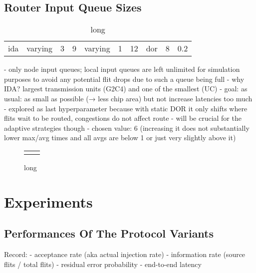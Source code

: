 \subsection{Router Input Queue Sizes}
\begin{table}
    \centering
    \begin{tabulary}{\textwidth}{C|C|C|C|C|C|C|C|C|C}
        \pProtVar{} & \pNCMode{} & \pEncMods{} & \pAuthMods{} & \pRQSize{} & \pARQLimit{} & \pARQTimeout{} & \pRStrat{} & \pNumAttackers{} & \pAttackProb{} \\\hline
        \gls{ida} & varying & 3 & 9 & varying & 1 & 12 & \gls{dor} & 8 & 0.2 \\
    \end{tabulary}
    \caption[Input parameters for router queue sizes experiment]{long}
    \label{tab:setupqueuesizes}
\end{table}
- only node input queues; local input queues are left unlimited for simulation purposes to avoid any potential flit drops due to such a queue being full
- why IDA? largest transmission units (G2C4) and one of the smallest (UC)
- goal: as usual: as small as possible (→ less chip area) but not increase latencies too much
- explored as last hyperparameter because with static DOR it only shifts where flits wait to be routed, congestions do not affect route
  - will be crucial for the adaptive strategies though
- chosen value: 6 (increasing it does not substantially lower max/avg times and all avgs are below 1 or just very slightly above it)

\begin{figure}
    \centering
    \begin{tabular}{ll}
         & 
    \end{tabular}
    \caption[Results for router queue lengths experiment]{long}
    \label{fig:resultsqueuelengths}
\end{figure}

\section{Experiments}
\subsection{Performances Of The Protocol Variants}
Record:
- acceptance rate (aka actual injection rate)
- information rate (source flits / total flits)
- residual error probability
- end-to-end latency

